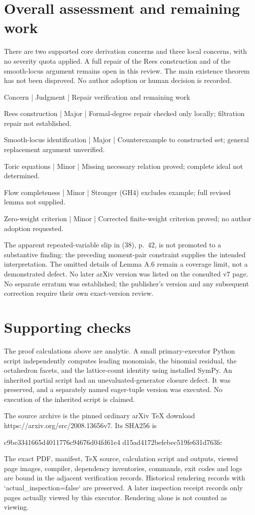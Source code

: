 \documentclass[10pt]{article}
\begin{document}
\section*{Overall assessment and remaining work}
There are two supported core derivation concerns and three local concerns, with no severity quota applied. A full repair of the Rees construction and of the smooth-locus argument remains open in this review. The main existence theorem has not been disproved. No author adoption or human decision is recorded.\par
Concern | Judgment | Repair verification and remaining work\par
Rees construction | Major | Formal-degree repair checked only locally; filtration repair not established.\par
Smooth-locus identification | Major | Counterexample to constructed set; general replacement argument unverified.\par
Toric equations | Minor | Missing necessary relation proved; complete ideal not determined.\par
Flow completeness | Minor | Stronger (GH4) excludes example; full revised lemma not supplied.\par
Zero-weight criterion | Minor | Corrected finite-weight criterion proved; no author adoption requested.\par
The apparent repeated-variable slip in (38), p. 42, is not promoted to a substantive finding: the preceding moment-pair constraint supplies the intended interpretation. The omitted details of Lemma A.6 remain a coverage limit, not a demonstrated defect. No later arXiv version was listed on the consulted v7 page. No separate erratum was established; the publisher’s version and any subsequent correction require their own exact-version review.\par
\section*{Supporting checks}
The proof calculations above are analytic. A small primary-executor Python script independently computes leading monomials, the binomial residual, the octahedron facets, and the lattice-count identity using installed SymPy. An inherited partial script had an unevaluated-generator closure defect. It was preserved, and a separately named eager-tuple version was executed. No execution of the inherited script is claimed.\par
The source archive is the pinned ordinary arXiv TeX download https://arxiv.org/src/2008.13656v7. Its SHA256 is\par
c9bc3341665d4011776c94676d04fd61e4
d15ad4172befebec519fe631d763fc\par
The exact PDF, manifest, TeX source, calculation script and outputs, viewed page images, compiler, dependency inventories, commands, exit codes and logs are bound in the adjacent verification records. Historical rendering records with `actual\_inspection=false` are preserved. A later inspection receipt records only pages actually viewed by this executor. Rendering alone is not counted as viewing.\par
\end{document}
